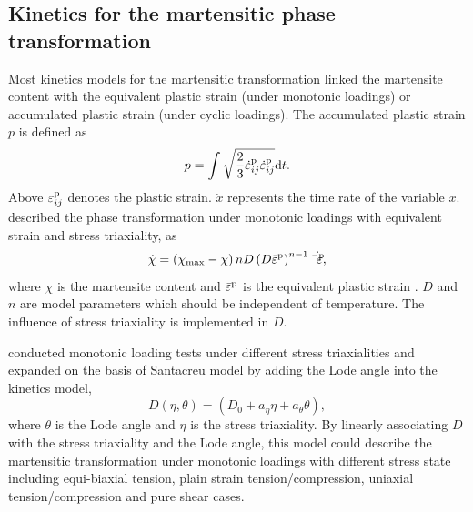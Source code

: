 \documentclass[preprint,5p,twocolumn,10pt,sort&compress]{elsarticle}
\begin{document}
\subsection{Kinetics for the martensitic phase transformation}
Most kinetics models for the martensitic transformation linked the martensite content with the equivalent plastic strain (under monotonic loadings) or accumulated plastic strain (under cyclic loadings). The accumulated plastic strain $p$ is defined as
\begin{equation}\label{eq:Accumulated plastic strain}
p=\int \sqrt{\frac{2}{3}{\dot\varepsilon _{ij}^{\rm p}\dot\varepsilon _{ij}^{\rm p}}}{\rm d}t.
\end{equation}
Above $\varepsilon _{ij}^{\rm p}$ denotes the plastic strain. $\dot x $ represents the time rate of the variable $x$. \cite{Santacreu2006Behaviour} described the phase transformation under monotonic loadings with equivalent strain and stress triaxiality, as
\begin{equation}\label{eq:Santacreu model}
\dot{\chi }= \left ( \chi _{\max} - \chi \right ) nD \left ( D \bar {\varepsilon}^{\rm p} \right )^{n-1}\dot{ \bar {\varepsilon }^{\rm p}},
\end{equation}
where $\chi$ is the martensite content and $\bar {\varepsilon }^{\rm p}$ is the equivalent plastic strain . $D$ and $n$ are model parameters which should be independent of temperature. The influence of stress triaxiality is implemented in $D$.

\cite{Beese2011Effect} conducted monotonic loading tests under different stress triaxialities and expanded on the basis of Santacreu model by adding the Lode angle  into the kinetics model,
\begin{equation}\label{eq:Beese model}
D\left ( \eta,\theta  \right )=\left ( D_{0}+a_{\eta}\eta+a_{\theta}\theta \right ),
\end{equation}
where $\theta$ is the Lode angle  and $\eta$ is the stress triaxiality. By linearly associating $D$ with the stress triaxiality and the Lode angle, this model could describe the martensitic transformation under monotonic loadings with different stress state including equi-biaxial tension, plain strain tension/compression, uniaxial tension/compression and pure shear cases.
\end{document}

